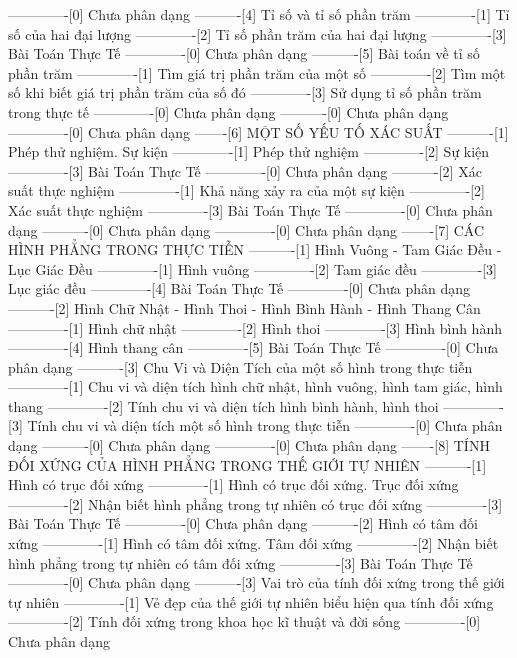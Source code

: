 -------------[0] Chưa phân dạng
----------[4] Tỉ số và tỉ số phần trăm
-------------[1] Tỉ số của hai đại lượng
-------------[2] Tỉ số phần trăm của hai đại lượng
-------------[3] Bài Toán Thực Tế
-------------[0] Chưa phân dạng
----------[5] Bài toán về tỉ số phần trăm
-------------[1] Tìm giá trị phần trăm của một số
-------------[2] Tìm một số khi biết giá trị phần trăm của số đó
-------------[3] Sử dụng tỉ số phần trăm trong thực tế
-------------[0] Chưa phân dạng
----------[0] Chưa phân dạng
-------------[0] Chưa phân dạng
-------[6] MỘT SỐ YẾU TỐ XÁC SUẤT
----------[1] Phép thử nghiệm. Sự kiện
-------------[1] Phép thử nghiệm
-------------[2] Sự kiện
-------------[3] Bài Toán Thực Tế
-------------[0] Chưa phân dạng
----------[2] Xác suất thực nghiệm
-------------[1] Khả năng xảy ra của một sự kiện
-------------[2] Xác suất thực nghiệm
-------------[3] Bài Toán Thực Tế
-------------[0] Chưa phân dạng
----------[0] Chưa phân dạng
-------------[0] Chưa phân dạng
-------[7] CÁC HÌNH PHẲNG TRONG THỰC TIỄN
----------[1] Hình Vuông - Tam Giác Đều - Lục Giác Đều
-------------[1] Hình vuông
-------------[2] Tam giác đều
-------------[3] Lục giác đều
-------------[4] Bài Toán Thực Tế
-------------[0] Chưa phân dạng
----------[2] Hình Chữ Nhật - Hình Thoi - Hình Bình Hành - Hình Thang Cân
-------------[1] Hình chữ nhật
-------------[2] Hình thoi
-------------[3] Hình bình hành
-------------[4] Hình thang cân
-------------[5] Bài Toán Thực Tế
-------------[0] Chưa phân dạng
----------[3] Chu Vi và Diện Tích của một số hình trong thực tiễn
-------------[1] Chu vi và diện tích hình chữ nhật, hình vuông, hình tam giác, hình thang
-------------[2] Tính chu vi và diện tích hình bình hành, hình thoi
-------------[3] Tính chu vi và diện tích một số hình trong thực tiễn
-------------[0] Chưa phân dạng
----------[0] Chưa phân dạng
-------------[0] Chưa phân dạng
-------[8] TÍNH ĐỐI XỨNG CỦA HÌNH PHẲNG TRONG THẾ GIỚI TỰ NHIÊN
----------[1] Hình có trục đối xứng
-------------[1] Hình có trục đối xứng. Trục đối xứng
-------------[2] Nhận biết hình phẳng trong tự nhiên có trục đối xứng
-------------[3] Bài Toán Thực Tế
-------------[0] Chưa phân dạng
----------[2] Hình có tâm đối xứng
-------------[1] Hình có tâm đối xứng. Tâm đối xứng
-------------[2] Nhận biết hình phẳng trong tự nhiên có tâm đối xứng
-------------[3] Bài Toán Thực Tế
-------------[0] Chưa phân dạng
----------[3] Vai trò của tính đối xứng trong thế giới tự nhiên
-------------[1] Vẻ đẹp của thế giới tự nhiên biểu hiện qua tính đối xứng
-------------[2] Tính đối xứng trong khoa học kĩ thuật và đời sống
-------------[0] Chưa phân dạng
